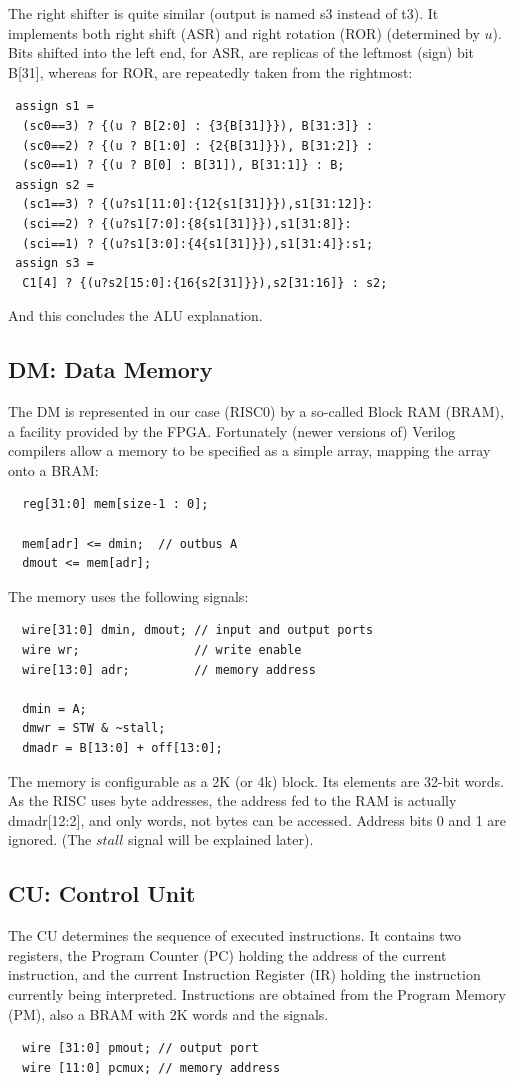 The right shifter is quite similar (output is named s3 instead of t3). It implements both right
shift (ASR) and right rotation (ROR) (determined by $u$). Bits shifted into the left end, for
ASR, are replicas of the leftmost (sign) bit B[31], whereas for ROR, are repeatedly taken from
the rightmost:
\begin{verbatim}
 assign s1 =
  (sc0==3) ? {(u ? B[2:0] : {3{B[31]}}), B[31:3]} :
  (sc0==2) ? {(u ? B[1:0] : {2{B[31]}}), B[31:2]} :
  (sc0==1) ? {(u ? B[0] : B[31]), B[31:1]} : B;
 assign s2 =
  (sc1==3) ? {(u?s1[11:0]:{12{s1[31]}}),s1[31:12]}:
  (sci==2) ? {(u?s1[7:0]:{8{s1[31]}}),s1[31:8]}:
  (sci==1) ? {(u?s1[3:0]:{4{s1[31]}}),s1[31:4]}:s1;
 assign s3 =
  C1[4] ? {(u?s2[15:0]:{16{s2[31]}}),s2[31:16]} : s2;
\end{verbatim}
And this concludes the ALU explanation.

\subsection{DM: Data Memory}
The DM is represented in our case (RISC0) by a so-called Block RAM (BRAM), a facility provided by
the FPGA. Fortunately (newer versions of) Verilog compilers allow a memory to be specified as a
simple array, mapping the array onto a BRAM:
\begin{verbatim}
  reg[31:0] mem[size-1 : 0];

  mem[adr] <= dmin;  // outbus A
  dmout <= mem[adr];
\end{verbatim}

The memory uses the following signals:
\begin{verbatim}
  wire[31:0] dmin, dmout; // input and output ports
  wire wr;                // write enable
  wire[13:0] adr;         // memory address
 
  dmin = A;
  dmwr = STW & ~stall;
  dmadr = B[13:0] + off[13:0];
\end{verbatim}

The memory is configurable as a 2K (or 4k) block. Its elements are 32-bit words. As the RISC uses
byte addresses, the address fed to the RAM is actually dmadr[12:2], and only words, not bytes can
be accessed. Address bits 0 and 1 are ignored. (The $stall$ signal will be explained later).

\subsection{CU: Control Unit}
The CU determines the sequence of executed instructions. It contains two registers, the Program
Counter (PC) holding the address of the current instruction, and the current Instruction Register
(IR) holding the instruction currently being interpreted. Instructions are obtained from the
Program Memory (PM), also a BRAM with 2K words and the signals.
\begin{verbatim}
  wire [31:0] pmout; // output port
  wire [11:0] pcmux; // memory address
\end{verbatim}

